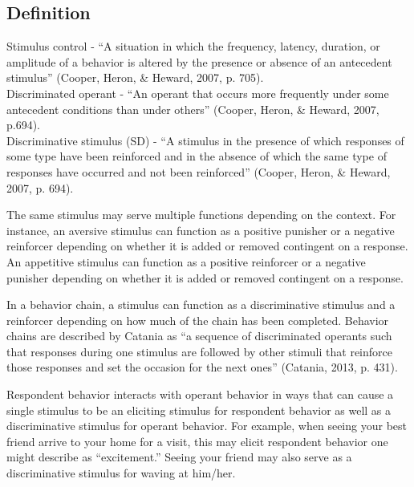 \subsection{Definition}
Stimulus control - ``A situation in which the frequency, latency, duration, or amplitude of a behavior is altered by the presence or absence of an antecedent stimulus'' (Cooper, Heron, \& Heward, 2007, p. 705).\\

Discriminated operant - ``An operant that occurs more frequently under some antecedent conditions than under others'' (Cooper, Heron, \& Heward, 2007, p.694).\\

Discriminative stimulus (SD) - ``A stimulus in the presence of which responses of some type have been reinforced and in the absence of which the same type of responses have occurred and not been reinforced''  (Cooper, Heron, \& Heward, 2007, p. 694).

The same stimulus may serve multiple functions depending on the context. For instance, an aversive stimulus can function as a positive punisher or a negative reinforcer depending on whether it is added or removed contingent on a response. An appetitive stimulus can function as a positive reinforcer or a negative punisher depending on whether it is added or removed contingent on a response.

In a behavior chain, a stimulus can function as a discriminative stimulus and a reinforcer depending on how much of the chain has been completed. Behavior chains are described by Catania as ``a sequence of discriminated operants such that responses during one stimulus are followed by other stimuli that reinforce those responses and set the occasion for the next ones'' (Catania, 2013, p. 431).

Respondent behavior interacts with operant behavior in ways that can cause a single stimulus to be an eliciting stimulus for respondent behavior as well as a discriminative stimulus for operant behavior. For example, when seeing your best friend arrive to your home for a visit, this may elicit respondent behavior one might describe as ``excitement.'' Seeing your friend may also serve as a discriminative stimulus for waving at him/her.
%
